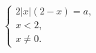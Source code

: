 \documentclass[14pt]{article}
\begin{document}
\begin{equation*}
 \begin{cases}
   2 |x|(2 - x) = a, 
   \\
   x < 2,
   \\
   x \ne 0.
 \end{cases}
\end{equation*}
\end{document}
